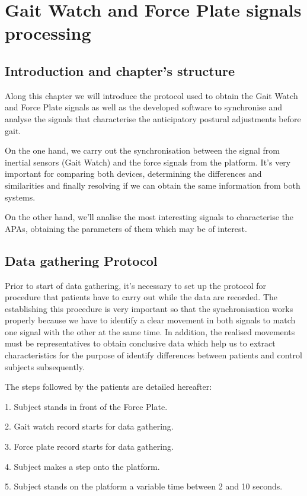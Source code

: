 \chapter{Gait Watch and Force Plate signals processing}
\label{ch:GWandFP}

\section{Introduction and chapter's structure}
Along this chapter we will introduce the protocol used to obtain the Gait Watch and Force Plate signals as well as the developed software to synchronise and analyse the signals that characterise the anticipatory postural adjustments before gait.

On the one hand, we carry out the synchronisation between the signal from inertial sensors (Gait Watch) and the force signals from the platform. It's very important for comparing both devices, determining the differences and similarities and finally resolving if we can obtain the same information from both systems.

On the other hand, we’ll analise the most interesting signals to characterise the APAs, obtaining the parameters of them which may be of interest.


\section{Data gathering Protocol}
Prior to start of data gathering, it’s necessary to set up the protocol for procedure that patients have to carry out while the data are recorded. The establishing this procedure is very important so that the synchronisation works properly because we have to identify a clear movement in both signals to match one signal with the other at the same time.
In addition, the realised movements must be representatives to obtain conclusive data which help us to extract characteristics for the purpose of identify differences between patients and control subjects subsequently.

The steps followed by the patients are detailed hereafter:

1.	Subject stands in front of the Force Plate.

2.	Gait watch record starts for data gathering.

3.	Force plate record starts for data gathering.

4.	Subject makes a step onto the platform.

5.	Subject stands on the platform a variable time between 2 and 10 seconds.

